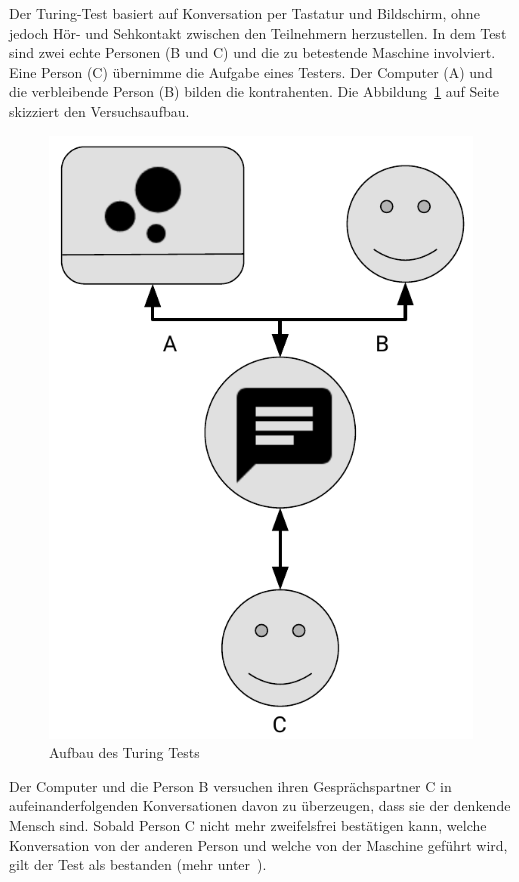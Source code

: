 Der Turing-Test basiert auf Konversation per Tastatur und Bildschirm, ohne jedoch Hör- und Sehkontakt zwischen den
Teilnehmern herzustellen. In dem Test sind zwei echte Personen (B und C) und die zu betestende Maschine involviert. Eine
Person (C) übernimme die Aufgabe eines Testers. Der Computer (A) und die verbleibende Person (B) bilden die kontrahenten.
Die Abbildung~\ref{fig:grundlagen_turingtest} auf Seite~\pageref{fig:grundlagen_turingtest} skizziert den Versuchsaufbau.

\begin{figure}[h]
    \centering
    \includegraphics[scale=0.6]{images/kapitel_2/turing_test.pdf}
    \caption{Aufbau des Turing Tests}
    \label{fig:grundlagen_turingtest}
\end{figure}

Der Computer und die Person B versuchen ihren Gesprächspartner C in aufeinanderfolgenden Konversationen davon zu
überzeugen, dass sie der denkende Mensch sind. Sobald Person C nicht mehr zweifelsfrei bestätigen kann, welche
Konversation von der anderen Person und welche von der Maschine geführt wird, gilt der Test als bestanden (mehr
unter~\cite{online_grundlagen_turing}).

